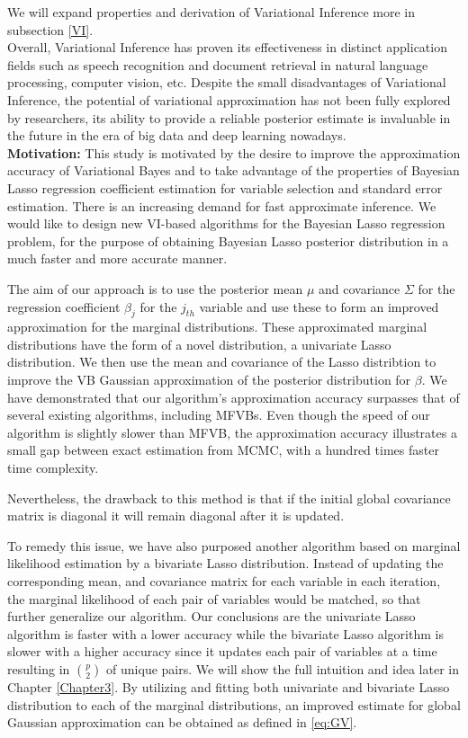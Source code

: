 We will expand properties and derivation of Variational Inference more in subsection \ref{VI}.\\
Overall, Variational Inference has proven its effectiveness in distinct application fields such as speech recognition and document retrieval in natural language processing, computer vision, etc. Despite the small disadvantages of Variational Inference, the potential of variational approximation has not been fully explored by researchers, its ability to provide a reliable posterior estimate is invaluable in the future in the era of big data and deep learning nowadays.\\
\textbf{Motivation:}
This study is motivated by the desire to improve the approximation accuracy of Variational Bayes and to take advantage of the properties of Bayesian Lasso regression coefficient estimation for variable selection and standard error estimation. There is an increasing demand for fast approximate inference. We would like to design new VI-based algorithms for the Bayesian Lasso regression problem, for the purpose of obtaining Bayesian Lasso posterior distribution in a much faster and more accurate manner.

The aim of our approach is to use the posterior mean $\mu$ and covariance $\Sigma$ for the regression coefficient $\beta_j$ for the $j_{th}$ variable and use these to form an improved approximation for the marginal distributions. These approximated marginal distributions have the form of a novel distribution, a univariate Lasso distribution.
We then use the mean and covariance of the Lasso distribtion to improve the VB Gaussian approximation of the posterior distribution for $\beta$. We have demonstrated that our algorithm's approximation accuracy surpasses that of several existing algorithms, including MFVBs. Even though the speed of our algorithm is slightly slower than MFVB, the approximation accuracy illustrates a small gap between exact estimation from MCMC, with a hundred times faster time complexity. 

Nevertheless, the drawback to this method is that if the initial global covariance matrix is diagonal it will remain diagonal after it is updated.

To remedy this issue, we have also purposed another algorithm based on marginal likelihood estimation by a bivariate Lasso distribution. Instead of updating the corresponding mean, and covariance matrix for each variable in each iteration, the marginal likelihood of each pair of variables would be matched, so that further generalize our algorithm. Our conclusions are the univariate Lasso algorithm is faster with a lower accuracy while the bivariate Lasso algorithm is slower with a higher accuracy since it updates each pair of variables at a time resulting in ${p\choose 2}$ of unique pairs. We will show the full intuition and idea later in Chapter \ref{Chapter3}.
By utilizing and fitting both univariate and bivariate Lasso distribution to each of the marginal distributions, an improved estimate for global Gaussian approximation can be obtained as defined in \autoref{eq:GV}. 

